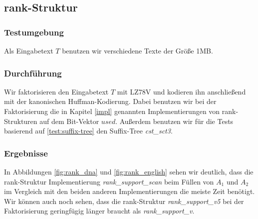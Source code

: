 \documentclass[a4paper,11pt]{scrartcl}%
\theoremstyle{change}
\theoremstyle{nonumberplain}
\theoremstyle{change}
\theoremstyle{nonumberplain}
\theoremstyle{change}
\theoremstyle{nonumberplain}
\begin{document}
\subsection{rank-Struktur}

\subsubsection{Testumgebung}

Als Eingabetext $T$ benutzen wir verschiedene Texte der Größe 1MB. 

\subsubsection{Durchführung}

Wir faktorisieren den Eingabetext $T$ mit LZ78V und kodieren ihn anschließend mit der kanonischen Huffman-Kodierung. Dabei benutzen wir bei der Faktorisierung die in Kapitel \ref{impl} genannten Implementierungen von rank-Strukturen auf dem Bit-Vektor $used$. Außerdem benutzen wir für die Tests basierend auf \autoref{test:suffix-tree} den Suffix-Tree \textit{cst\_sct3}.
\newpage
\subsubsection{Ergebnisse}

In Abbildungen \ref{fig:rank_dna} und \ref{fig:rank_english} sehen wir deutlich, dass die rank-Struktur Implementierung \textit{rank\_support\_scan} beim Füllen von $A_1$ und $A_2$ im Vergleich mit den beiden anderen Implementierungen die meiste Zeit benötigt. Wir können auch noch sehen, dass die rank-Struktur \textit{rank\_support\_v5} bei der Faktorisierung geringfügig länger braucht als \textit{rank\_support\_v}. 
\end{document}
